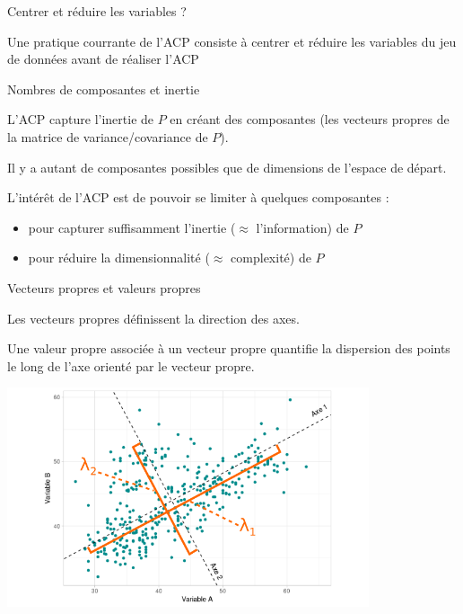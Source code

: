 \documentclass{beamer}
\begin{document}
\begin{frame}{Centrer et réduire les variables ?}

 
 Une pratique courrante de l'ACP consiste à \alert{centrer} et \alert{réduire} les variables du jeu de données avant de réaliser l'ACP




\end{frame}




\begin{frame}{Nombres de composantes et inertie}

L'ACP capture l'inertie de $P$ en créant des \alert{composantes} (les vecteurs propres de  la matrice de variance/covariance de $P$). 

\medskip

Il y a autant de composantes possibles que de dimensions de l'espace de départ. 

\medskip  


L'intérêt de l'ACP est de pouvoir se limiter à \alert{quelques} composantes :  
\begin{itemize}
\item  pour capturer suffisamment l'inertie ($\approx$ l'information) de $P$
\item  pour réduire la dimensionnalité ($\approx$ complexité) de $P$
\end{itemize}

\end{frame}


\begin{frame}{Vecteurs propres et valeurs propres }

Les \alert{vecteurs propres} définissent la \alert{direction} des axes.

Une \alert{valeur propre}  associée à un vecteur propre  quantifie la \alert{dispersion} des points le long de l'axe orienté par le vecteur propre.

\centering
\includegraphics[width=0.8\textwidth,keepaspectratio]{img/exemple_2D_axe_eigen.png}



\end{frame}
\end{document}
